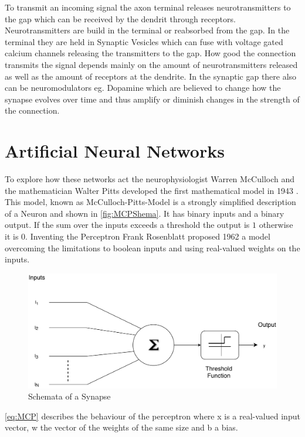 To transmit an incoming signal the axon terminal releases neurotransmitters to the gap which can be received by the dendrit through receptors. Neurotransmitters are build in the terminal or reabsorbed from the gap. In the terminal they are held in Synaptic Vesicles which can fuse with voltage gated calcium channels releasing the transmitters to the gap\cite{Catterall411}. How good the connection transmits the signal depends mainly on the amount of neurotransmitters released as well as the amount of receptors at the dendrite. 
In the synaptic gap there also can be neuromodulators eg. Dopamine which are believed to change how the synapse evolves over time and thus amplify or diminish changes in the strength of the connection.

\section{Artificial Neural Networks}
To explore how these networks act the neurophysiologist Warren McCulloch and the mathematician Walter Pitts developed the first mathematical model in 1943 \cite{mcculloch1943logical}. This model, known as McCulloch-Pitts-Model is a strongly simplified description of a Neuron and shown in \autoref{fig:MCPShema}. It has binary inputs and a binary output. If the sum over the  inputs exceeds a threshold the output is $1$ otherwise it is $0$. Inventing the Perceptron Frank Rosenblatt proposed 1962 a model overcoming the limitations to boolean inputs and using real-valued weights on the inputs.
\begin{figure}[htpb]
  \centering
  \includegraphics[scale=0.65]{figures/McPSchema.pdf}
  \caption[Schemata of McCulloch-Pitts-Model]{Schemata of a Synapse \cite{wikiSyn}}
  \label{fig:MCPShema}
\end{figure}
\autoref{eq:MCP} describes the behaviour of the perceptron where x is a real-valued input vector, w the vector of the weights of the same size and b a bias. 
\newline

